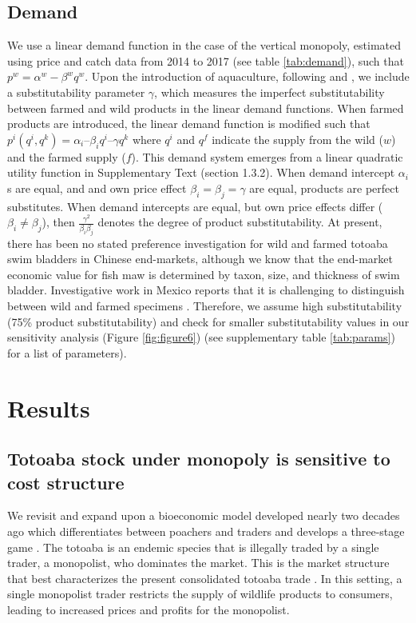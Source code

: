 \subsection{Demand}
We use a linear demand function in the case of the vertical monopoly, estimated using price and catch data from 2014 to 2017 (see table \ref{tab:demand}), such that $p^w = \alpha^w - \beta^w q^w$. Upon the introduction of aquaculture, following \cite{singh_price_1984} and \cite{damania_economics_2007}, we include a substitutability parameter $\gamma$, which measures the imperfect substitutability between farmed and wild products in the linear demand functions. When farmed products are introduced, the linear demand function is modified such that $p^i(q^i,q^k)=\alpha_i – \beta_i q^i – \gamma q^k$ where $q^i$ and $q^f$ indicate the supply from the wild ($w$) and the farmed supply ($f$). This demand system emerges from a linear quadratic utility function in Supplementary Text (section 1.3.2). When demand intercept $\alpha_i$s are equal, and and own price effect $\beta_i=\beta_j = \gamma$ are equal, products are perfect substitutes. When demand intercepts are equal, but own price effects differ ($\beta_i \neq \beta_j$), then $\frac{\gamma^2}{\beta_i \beta_j}$ denotes the degree of product substitutability. 
At present, there has been no stated preference investigation for wild and farmed totoaba swim bladders in Chinese end-markets, although we know that the end-market economic value for fish maw is determined by taxon, size, and thickness of swim bladder. Investigative work in Mexico reports that it is challenging to distinguish between wild and farmed specimens \citep{elephant_action_league_operation_2018}. Therefore, we assume high substitutability (75\% product substitutability) and check for smaller substitutability values in our sensitivity analysis (Figure \ref{fig:figure6}) (see supplementary table \ref{tab:params}) for a list of parameters).


\section{Results}
\subsection{Totoaba stock under monopoly is sensitive to cost structure}

We revisit and expand upon a bioeconomic model developed nearly two decades ago which differentiates between poachers and traders and develops a three-stage game \citep{bulte_economic_2005, damania_economics_2007}. The totoaba is an endemic species that is illegally traded by a single trader, a monopolist, who dominates the market. This is the market structure that best characterizes the present consolidated totoaba trade \citep{felbab_brown_organized_2022}. In this setting, a single monopolist trader restricts the supply of wildlife products to consumers, leading to increased prices and profits for the monopolist.

